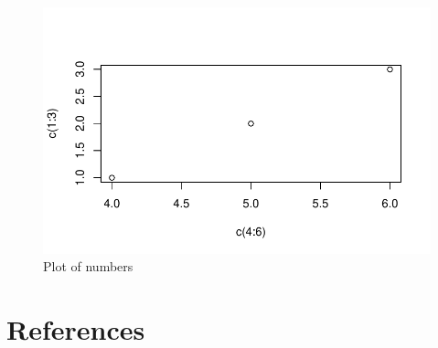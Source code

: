 \documentclass[
  12pt,
  letterpaper,
  DIV=11,
  numbers=noendperiod]{scrreprt}
\begin{document}
\begin{figure}

{\centering \includegraphics{summary_files/figure-pdf/fig-plot-1.pdf}

}

\caption{\label{fig-plot}Plot of numbers}

\end{figure}


\hypertarget{references}{%
\chapter*{References}\label{references}}

\end{document}
